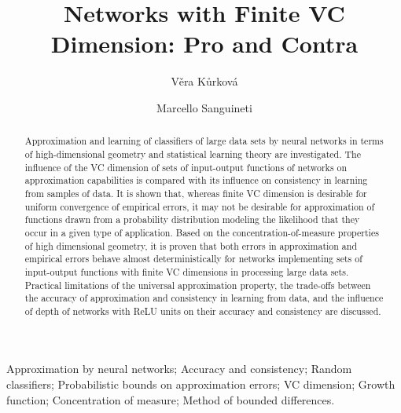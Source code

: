 \documentclass{elsarticle}
\begin{document}
\begin{frontmatter}

\title{Networks with Finite VC Dimension: Pro and Contra}

\author[VK]{V\v{e}ra K\r{u}rkov\'{a}}

\address[VK]{Institute of Computer Science of the Czech Academy of Sciences \\
Pod Vod\'{a}renskou v\v{e}\v{z}\'\i,  2 - 18207 Prague, Czech Republic} 

\author[MS]{Marcello Sanguineti}

\address[MS]{DIBRIS \\ University of Genova \\ Via Opera Pia, 13 - 16145 Genova, Italy}

\date{}

\maketitle



\begin{abstract}
Approximation and learning of classifiers of large data sets by neural networks in terms of high-dimensional geometry and statistical learning theory are investigated. The influence of the VC dimension of sets of input-output functions of networks on approximation capabilities is compared with its influence on consistency in learning from samples of data. It is shown that, whereas finite VC dimension is desirable for uniform convergence of empirical errors, it may not be desirable for approximation of functions drawn from a
probability distribution modeling the likelihood that they occur in a given type of application.
Based on the concentration-of-measure properties of high dimensional geometry, it is proven that both errors in approximation and empirical errors behave almost deterministically for networks implementing sets of input-output functions with finite VC dimensions in processing large data sets.
Practical limitations of the universal approximation property, the trade-offs between the accuracy of approximation and consistency in learning from data,
and the influence of depth of networks with ReLU units on their accuracy and consistency are discussed.
\end{abstract}
\begin{keyword} Approximation by neural networks;  Accuracy and consistency; Random classifiers; Probabilistic bounds on approximation errors;  VC dimension; Growth function; Concentration of measure; Method of bounded differences.
\end{keyword}

\end{frontmatter}
\end{document}
